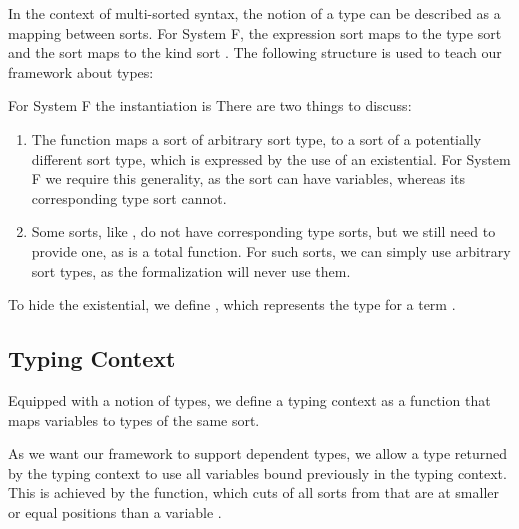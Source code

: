 \documentclass[a4paper, UKenglish, cleveref, autoref, thm-restate]{lipics-v2021}
\newenvironment{LibCode*}{%
  \begin{tcolorbox}[%
    colframe=white,%
    boxrule=0.0pt,%
    top=2.5pt,%
    left=2.5pt,%
    bottom=2.5pt,%
    right=2.5pt,%
    before skip=5pt,%
    after skip=5pt,%
    boxsep=0pt%
  ]
}{%
  \end{tcolorbox}%
}
\newcommand*\LibCode[1]{\begin{LibCode*}{#1}\end{LibCode*}}
\newcommand*\AppCode[1]{{#1}}
\newcommand*\ACode[1]{\AgdaFontStyle{\textcolor{mygray}{#1}}}
\newcommand*\AField[1]{\AgdaField{#1}}
\newcommand*\ACon[1]{\AgdaInductiveConstructor{#1}}
\begin{document}
  In the context of multi-sorted syntax, the notion of a type can be
  described as a mapping between sorts.
  For System F, the expression sort \ACode{\ACon{𝕖}} maps to the type sort
  \ACode{\ACon{𝕥}} and the sort \ACode{\ACon{𝕥}} maps to the kind sort
  \ACode{\ACon{𝕜}}.
  The following structure is used to teach our framework about types:
  \LibCode\KTypeSorts
  For System F the instantiation is
  \AppCode\FTypes
  There are two things to discuss:
  \begin{enumerate}
  \item
    The \ACode{\AField{↑ᵗ}} function maps a sort of arbitrary sort type,
    to a sort of a potentially different sort type, which is expressed
    by the use of an existential.
    For System F we require this generality, as the sort
    \ACode{\ACon{𝕥}} can have variables, whereas its corresponding type
    sort \ACode{\ACon{𝕜}} cannot.
  \item
    Some sorts, like \ACode{\ACon{𝕜}}, do not have corresponding type
    sorts, but we still need to provide one, as \ACode{\AField{↑ᵗ}} is a
    total function.
    For such sorts, we can simply use arbitrary sort types, as the
    formalization will never use them.
  \end{enumerate}
  To hide the existential, we define \ACode{S \ACon{∶⊢} s}, which represents
  the type for a term \ACode{S \ACon{⊢} s}.
  \LibCode\KTypes

  \subsection{Typing Context}
  Equipped with a notion of types, we define a typing context as a
  function that maps variables to types of the same sort.

  As we want our framework to support dependent types, we allow a type returned
  by the typing context to use all variables bound previously in the typing context.
  This is achieved by the \ACode{drop-∈} function, which cuts of all
  sorts from \ACode{S} that are at smaller or equal positions than a variable \ACode{x}.

  \noindent
  \begin{minipage}{1.0\linewidth}
    \begin{minipage}{0.5\linewidth}
      \LibCode\KContexts
      \vspace{3mm}
    \end{minipage}
    \begin{minipage}{0.5\linewidth}
      \LibCode\KContextExt
    \end{minipage}
  \end{minipage}
\end{document}
